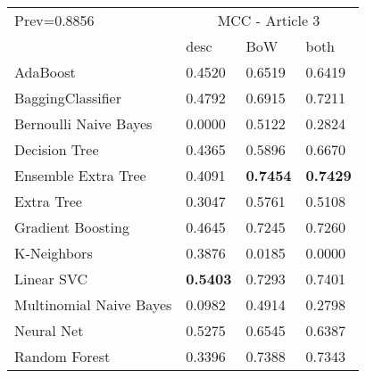 \begin{tabular}{|l|l|l|l| }
\hline
Prev=0.8856 &  \multicolumn{3}{c|}{MCC - Article 3} \\
\cline{2-4} & desc & BoW & both \\ \hline
AdaBoost                & 0.4520 & 0.6519 & 0.6419\\
BaggingClassifier       & 0.4792 & 0.6915 & 0.7211\\
Bernoulli Naive Bayes   & 0.0000 & 0.5122 & 0.2824\\
Decision Tree           & 0.4365 & 0.5896 & 0.6670\\
Ensemble Extra Tree     & 0.4091 & {\bf 0.7454} & {\bf 0.7429}\\
Extra Tree              & 0.3047 & 0.5761 & 0.5108\\
Gradient Boosting       & 0.4645 & 0.7245 & 0.7260\\
K-Neighbors             & 0.3876 & 0.0185 & 0.0000\\
Linear SVC              & {\bf 0.5403} & 0.7293 & 0.7401\\
Multinomial Naive Bayes & 0.0982 & 0.4914 & 0.2798\\
Neural Net              & 0.5275 & 0.6545 & 0.6387\\
Random Forest           & 0.3396 & 0.7388 & 0.7343\\
\hline
\end{tabular}